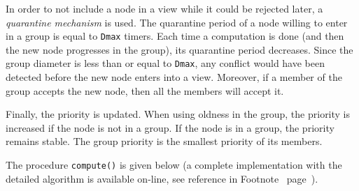 \documentclass[11pt,english]{article}
\begin{document}
In order to not include a node in a view while it could be rejected later, a
\emph{quarantine mechanism} is used. The quarantine period of a node willing to
enter in a group is equal to \texttt{Dmax} timers. Each time a computation is
done (and then the new node progresses in the group), its quarantine period
decreases. Since the group diameter is less than or equal to \texttt{Dmax}, any
conflict would have been detected before the new node enters into a
view. Moreover, if a member of the group accepts the new node, then all the
members will accept it.

Finally, the priority is updated. When using oldness in the group, the priority
is increased if the node is not in a group. If the node is in a group, the
priority remains stable. The group priority is the smallest priority of its members.

The procedure \texttt{compute()} is given below (a complete implementation with
the detailed algorithm is available on-line, see reference in
Footnote~\pageref{refonline} page~\pageref{refonline}).
\end{document}
